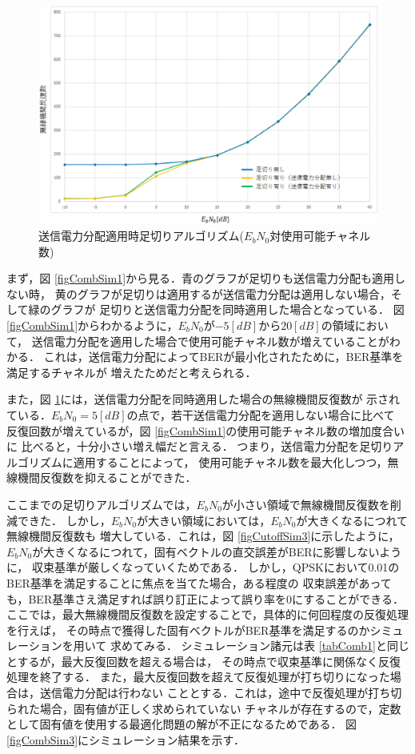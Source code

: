 \begin{figure}[t]
    \centering
    \includegraphics[width=0.95\linewidth]{chapter4/figure/CombSim2.eps}
    \caption{送信電力分配適用時足切りアルゴリズム($E_bN_0$対使用可能チャネル数)}
    \label{figCombSim2}
\end{figure}

まず，図 \ref{figCombSim1}から見る．青のグラフが足切りも送信電力分配も適用しない時，
黄のグラフが足切りは適用するが送信電力分配は適用しない場合，そして緑のグラフが
足切りと送信電力分配を同時適用した場合となっている．
図 \ref{figCombSim1}からわかるように，$E_bN_0$が$-5[dB]$から$20[dB]$の領域において，
送信電力分配を適用した場合で使用可能チャネル数が増えていることがわかる．
これは，送信電力分配によってBERが最小化されたために，BER基準を満足するチャネルが
増えたためだと考えられる．

また，図 \ref{figCombSim2}には，送信電力分配を同時適用した場合の無線機間反復数が
示されている．$E_bN_0=5[dB]$の点で，若干送信電力分配を適用しない場合に比べて
反復回数が増えているが，図 \ref{figCombSim1}の使用可能チャネル数の増加度合いに
比べると，十分小さい増え幅だと言える．
つまり，送信電力分配を足切りアルゴリズムに適用することによって，
使用可能チャネル数を最大化しつつ，無線機間反復数を抑えることができた．

ここまでの足切りアルゴリズムでは，$E_bN_0$が小さい領域で無線機間反復数を削減できた．
しかし，$E_bN_0$が大きい領域においては，$E_bN_0$が大きくなるにつれて無線機間反復数も
増大している．これは，図 \ref{figCutoffSim3}に示したように，
$E_bN_0$が大きくなるにつれて，固有ベクトルの直交誤差がBERに影響しないように，
収束基準が厳しくなっていくためである．
しかし，QPSKにおいて0.01のBER基準を満足することに焦点を当てた場合，ある程度の
収束誤差があっても，BER基準さえ満足すれば誤り訂正によって誤り率を0にすることができる．
ここでは，最大無線機間反復数を設定することで，具体的に何回程度の反復処理を行えば，
その時点で獲得した固有ベクトルがBER基準を満足するのかシミュレーションを用いて
求めてみる．
シミュレーション諸元は表 \ref{tabComb1}と同じとするが，最大反復回数を超える場合は，
その時点で収束基準に関係なく反復処理を終了する．
また，最大反復回数を超えて反復処理が打ち切りになった場合は，送信電力分配は行わない
こととする．これは，途中で反復処理が打ち切られた場合，固有値が正しく求められていない
チャネルが存在するので，定数として固有値を使用する最適化問題の解が不正になるためである．
図 \ref{figCombSim3}にシミュレーション結果を示す．

